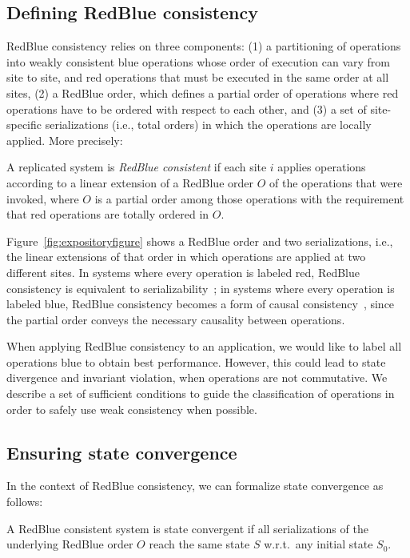 \documentclass[11pt,dvipdfm]{article}
\begin{document}
\subsection{Defining RedBlue consistency}

RedBlue consistency relies on three components: (1) a partitioning of operations into weakly consistent blue operations whose order of execution
can vary from site to site, and red operations that must
be executed in the same order at all sites, (2) a RedBlue order, which defines a partial order of
operations where red operations have to be ordered with respect to each other, and (3) a set of site-specific serializations (i.e., total orders)
in which the operations are locally applied. More precisely:

\begin{mydef}
A replicated system is {\em RedBlue consistent} if each site $i$ applies
operations according to a linear extension of a RedBlue order $O$ of the operations
that were invoked, where $O$ is a partial order among those operations with the requirement that red operations are totally ordered in $O$.
\label{def:rbct}
\end{mydef}

Figure~\ref{fig:expositoryfigure} shows a RedBlue order and two
serializations, i.e., the linear extensions of that order in which
operations are applied at two different sites. In systems where every operation is
labeled red, RedBlue consistency is equivalent to
serializability~\cite{Bernstein1987CCR}; in systems where every
operation is labeled blue, RedBlue consistency becomes a form of causal consistency~\cite{bayou,cops,
Mahajan2010Depot}, since the partial order conveys the necessary causality between operations.

When applying RedBlue consistency to an application, we would like to label all operations blue
to obtain best performance.
However, this could lead to state divergence and invariant violation, when operations are not commutative.
We describe a set of sufficient conditions to guide the classification of operations in order to safely use weak consistency
when possible.


\subsection{Ensuring state convergence}
In the context of RedBlue consistency, we can formalize state convergence as follows:

\begin{mydef}
A RedBlue consistent system is state convergent if all serializations of
the underlying RedBlue order $O$ reach the same state $S$ w.r.t.\ any initial state $S_0$.
\end{mydef}
\end{document}
